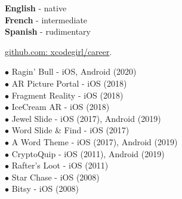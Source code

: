 \documentclass[9pt]{developercv} %
\begin{document}
\begin{minipage}[t]{0.5\textwidth}
	\vspace{-\baselineskip} %

	
	\textbf{English} - native\\
	\textbf{French} - intermediate\\
	\textbf{Spanish} - rudimentary


 {\href{https://github.com/xcodegirl/career/blob/main/xcodegirl-work-samples.md}{github.com: xcodegirl/career}}.

\end{minipage}
\hfill
\begin{minipage}[t]{0.5\textwidth}
	\vspace{-\baselineskip} %
	

$\bullet$ Ragin’ Bull - iOS, Android (2020)
\\ $\bullet$ AR Picture Portal - iOS (2018)
\\ $\bullet$ Fragment Reality - iOS (2018)
\\ $\bullet$ IceCream AR - iOS (2018)
\\ $\bullet$ Jewel Slide - iOS (2017), Android (2019)
\\ $\bullet$ Word Slide \& Find - iOS (2017)
\\ $\bullet$ A Word Theme - iOS (2017), Android (2019)
\\ $\bullet$ CryptoQuip - iOS (2011), Android (2019)
\\ $\bullet$ Rafter’s Loot - iOS (2011)
\\ $\bullet$ Star Chase - iOS (2008)
\\ $\bullet$ Bitsy - iOS (2008)

\end{minipage}

\end{document}
